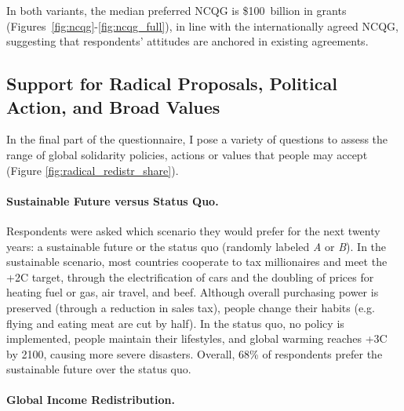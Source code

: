 \documentclass[12pt,english]{article}
\begin{document}
\begin{bibunit}
In both variants, the median preferred NCQG is \$100~billion in grants %
(Figures~\ref{fig:ncqg}-\ref{fig:ncqg_full}),  
in line with the internationally agreed NCQG, suggesting that respondents' attitudes are anchored in existing agreements. %

\subsection{Support for Radical Proposals, Political Action, and Broad Values}\label{subsec:radical}

In the final part of the questionnaire, I pose a variety of questions to assess the range of global solidarity policies, actions or values that people may accept (Figure \ref{fig:radical_redistr_share}).

\paragraph{Sustainable Future versus Status Quo.}\label{par:sustainable_future}

Respondents were asked which scenario they would prefer for the next twenty years: a sustainable future or the status quo (randomly labeled \textit{A} or \textit{B}). In the sustainable scenario, most countries cooperate to tax millionaires and meet the +2\textdegree{}C target, through the electrification of cars and the doubling of prices for heating fuel or gas, air travel, and beef. Although overall purchasing power is preserved (through a reduction in sales tax), people change their habits (e.g. flying and eating meat are cut by half). In the status quo, no policy is implemented, people maintain their lifestyles, and global warming reaches +3\textdegree{}C by 2100, causing more severe disasters. Overall, 68\% of respondents prefer the sustainable future over the status quo.

\paragraph{Global Income Redistribution.}\label{par:global_income_redistr}


\end{bibunit}
\end{document}
